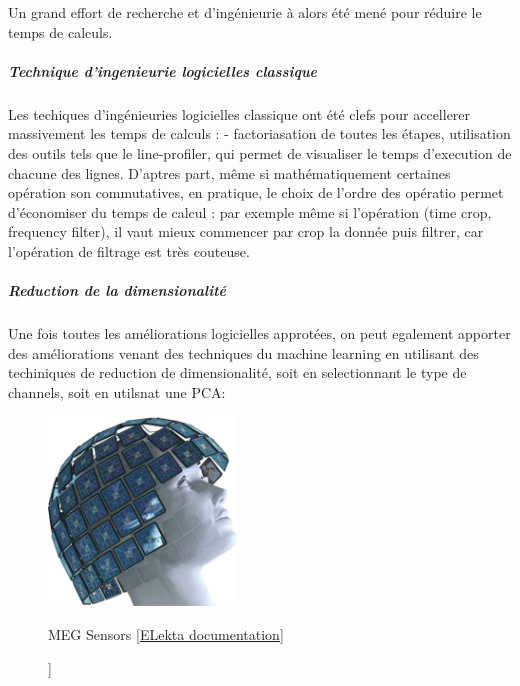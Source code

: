 Un grand effort de recherche et d'ingénieurie à alors été mené pour réduire le temps de calculs.

\subparagraph{Technique d'ingenieurie logicielles classique}

Les techiques d'ingénieuries logicielles classique ont été clefs pour accellerer massivement les temps de calculs : - factoriasation de toutes les étapes, utilisation des outils tels que le line-profiler, qui permet de visualiser le temps d'execution de chacune des lignes. D'aptres part, même si mathématiquement certaines opération son commutatives, en pratique, le choix de l'ordre des opératio permet d'économiser du temps de calcul : par exemple même si l'opération (time crop, frequency filter), il vaut mieux commencer par crop la donnée puis filtrer, car l'opération de filtrage est très couteuse.


\subparagraph{Reduction de la dimensionalité}

Une fois toutes les améliorations logicielles approtées, on peut egalement apporter des améliorations venant des techniques du machine learning en utilisant des techiniques de reduction de dimensionalité, soit en selectionnant le type de channels, soit en utilsnat une PCA:

\begin{figure}[ht]
    \centering
    \includegraphics[width=5cm]{images_report/sensor/sensors_elekta.png}
    \caption[MEG Sensors [\href{https://www.elekta.com/dam/jcr:ed6d88e7-cd3e-478e-9c4a-3f89ef90ec92/Elekta-Neuromag-TRIUX-Brochure.pdf}{ELekta documentation}]]%
    {MEG Sensors [\href{https://www.elekta.com/dam/jcr:ed6d88e7-cd3e-478e-9c4a-3f89ef90ec92/Elekta-Neuromag-TRIUX-Brochure.pdf}{ELekta documentation}]}
    \label{sensors_elekta}
\end{figure}

